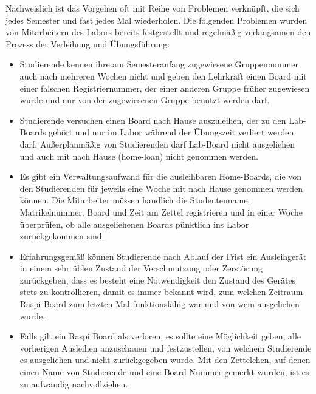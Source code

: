 Nachweislich ist das Vorgehen oft mit Reihe von Problemen verknüpft, die sich jedes Semester und fast jedes Mal wiederholen. Die folgenden Problemen wurden von Mitarbeitern des Labors bereits festgestellt und regelmäßig verlangsamen den Prozess der Verleihung und Übungsführung: 
\begin{itemize}
	\item Studierende kennen ihre am Semesteranfang zugewiesene Gruppennummer auch nach mehreren Wochen nicht und geben den Lehrkraft einen Board mit einer falschen Registriernummer, der einer anderen Gruppe früher zugewiesen wurde und nur von der zugewiesenen Gruppe benutzt werden darf. 
	\item Studierende versuchen  einen Board nach Hause auszuleihen, der zu den Lab-Boards gehört und nur im Labor während der Übungszeit verliert werden darf. Außerplanmäßig von Studierenden darf Lab-Board nicht ausgeliehen und auch mit nach Hause (home-loan) nicht genommen werden.
	\item Es gibt ein Verwaltungsaufwand für die ausleihbaren Home-Boards, die von den Studierenden für jeweils eine Woche mit nach Hause genommen werden können. Die Mitarbeiter müssen handlich die Studentenname, Matrikelnummer, Board und Zeit am Zettel registrieren und in einer Woche überprüfen, ob alle ausgeliehenen Boards pünktlich ins Labor zurückgekommen sind. 
	\item Erfahrungsgemäß können Studierende nach Ablauf der Frist ein Ausleihgerät in einem sehr üblen Zustand der Verschmutzung oder Zerstörung zurückgeben, dass es besteht eine Notwendigkeit den Zustand des Gerätes stets zu kontrollieren, damit es immer bekannt wird, zum welchen Zeitraum Raspi Board zum letzten Mal funktionsfähig war und von wem ausgeliehen wurde.  
	\item Falls gilt ein Raspi Board als verloren, es sollte eine Möglichkeit geben, alle vorherigen Ausleihen anzuschauen und festzustellen, von welchem Studierende es ausgeliehen und nicht zurückgegeben wurde. Mit den Zettelchen, auf denen einen Name von Studierende und eine Board Nummer gemerkt wurden, ist es zu aufwändig nachvollziehen.	
\end{itemize}

